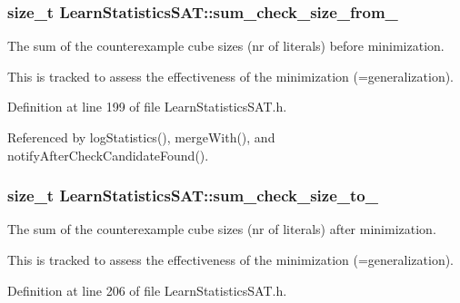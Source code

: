 \hypertarget{classLearnStatisticsSAT_a2d6735aa7c84c50967b3bb779d2a0a86}{
\subsubsection[{sum\-\_\-check\-\_\-size\-\_\-from\-\_\-}]{\setlength{\rightskip}{0pt plus 5cm}size\-\_\-t Learn\-Statistics\-S\-A\-T\-::sum\-\_\-check\-\_\-size\-\_\-from\-\_\-\hspace{0.3cm}{\ttfamily [protected]}}}\label{classLearnStatisticsSAT_a2d6735aa7c84c50967b3bb779d2a0a86}


The sum of the counterexample cube sizes (nr of literals) before minimization. 

This is tracked to assess the effectiveness of the minimization (=generalization). 

Definition at line 199 of file Learn\-Statistics\-S\-A\-T.\-h.



Referenced by log\-Statistics(), merge\-With(), and notify\-After\-Check\-Candidate\-Found().

\hypertarget{classLearnStatisticsSAT_ae805d5a2fc2f724d325136a9f30e6b4b}{
\subsubsection[{sum\-\_\-check\-\_\-size\-\_\-to\-\_\-}]{\setlength{\rightskip}{0pt plus 5cm}size\-\_\-t Learn\-Statistics\-S\-A\-T\-::sum\-\_\-check\-\_\-size\-\_\-to\-\_\-\hspace{0.3cm}{\ttfamily [protected]}}}\label{classLearnStatisticsSAT_ae805d5a2fc2f724d325136a9f30e6b4b}


The sum of the counterexample cube sizes (nr of literals) after minimization. 

This is tracked to assess the effectiveness of the minimization (=generalization). 

Definition at line 206 of file Learn\-Statistics\-S\-A\-T.\-h.



